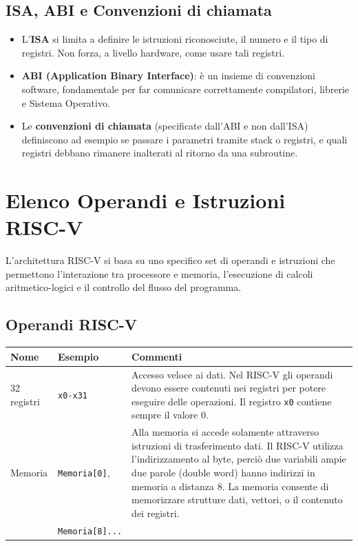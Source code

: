 \documentclass[12pt, a4paper]{article}
\begin{document}
\subsection{ISA, ABI e Convenzioni di chiamata}
\begin{itemize}
    \item L'\textbf{ISA} si limita a definire le istruzioni riconosciute, il numero e il tipo di registri. Non forza, a livello hardware, come usare tali registri.
    \item \textbf{ABI (Application Binary Interface)}: è un insieme di convenzioni software, fondamentale per far comunicare correttamente compilatori, librerie e Sistema Operativo.
    \item Le \textbf{convenzioni di chiamata} (specificate dall'ABI e non dall'ISA) definiscono ad esempio se passare i parametri tramite stack o registri, e quali registri debbano rimanere inalterati al ritorno da una subroutine.
\end{itemize}
\section{Elenco Operandi e Istruzioni RISC-V}
L'architettura RISC-V si basa su uno specifico set di operandi e istruzioni che permettono l'interazione tra processore e memoria, l'esecuzione di calcoli aritmetico-logici e il controllo del flusso del programma.

\subsection{Operandi RISC-V}
\begin{table}[H]
\centering
\begin{tabular}{l l p{10cm}}
\toprule
\textbf{Nome} & \textbf{Esempio} & \textbf{Commenti} \\
\midrule
32 registri & \texttt{x0-x31} & Accesso veloce ai dati. Nel RISC-V gli operandi devono essere contenuti nei registri per potere eseguire delle operazioni. Il registro \texttt{x0} contiene sempre il valore 0. \\
\addlinespace
Memoria & \texttt{Memoria[0]}, & Alla memoria si accede solamente attraverso istruzioni di trasferimento dati. Il RISC-V utilizza l'indirizzamento al byte, perciò due variabili ampie due parole (double word) hanno indirizzi in memoria a distanza 8. La memoria consente di memorizzare strutture dati, vettori, o il contenuto dei registri. \\
& \texttt{Memoria[8]...} & \\
\bottomrule
\end{tabular}
\end{table}
\end{document}
